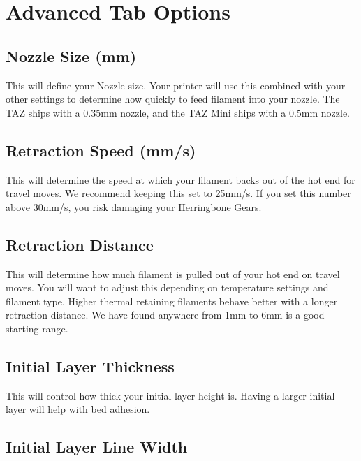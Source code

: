 \section{Advanced Tab Options}

\subsection{Nozzle Size (mm)}

This will define your Nozzle size. Your printer will use this combined with your other settings to determine how quickly to feed filament into your nozzle. The TAZ ships with a 0.35mm nozzle, and the TAZ Mini ships with a 0.5mm nozzle.

\subsection{Retraction Speed (mm/s)}

This will determine the speed at which your filament backs out of the hot end for travel moves. We recommend keeping this set to 25mm/s. If you set this number above 30mm/s, you risk damaging your Herringbone Gears.

\subsection{Retraction Distance}

This will determine how much filament is pulled out of your hot end on travel moves. You will want to adjust this depending on temperature settings and filament type. Higher thermal retaining filaments behave better with a longer retraction distance. We have found anywhere from 1mm to 6mm is a good starting range.

\subsection{Initial Layer Thickness}

This will control how thick your initial layer height is. Having a larger initial layer will help with bed adhesion.

\subsection{Initial Layer Line Width}

